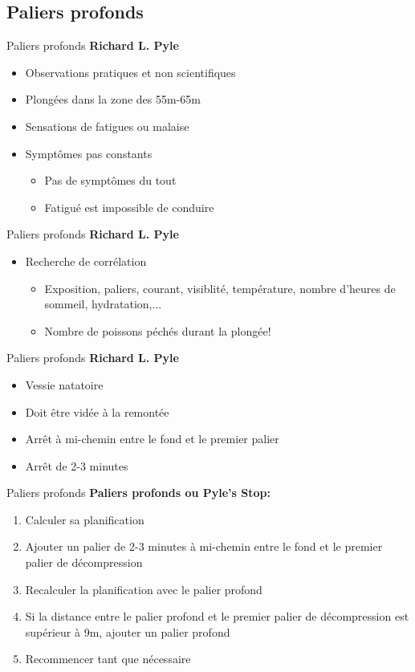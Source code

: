 \subsection{Paliers profonds}

\begin{frame}{Paliers profonds}
	\textbf{Richard L. Pyle}
	\begin{itemize}
		\item Observations pratiques et non scientifiques
		\item Plongées dans la zone des 55m-65m
		\item Sensations de fatigues ou malaise
		\item Symptômes pas constants
		\begin{itemize}
			\item Pas de symptômes du tout
			\item Fatigué est impossible de conduire
		\end{itemize}
	\end{itemize}
\end{frame}

\begin{frame}{Paliers profonds}
	\textbf{Richard L. Pyle}
	\begin{itemize}
	 	\item Recherche de corrélation
	 	\begin{itemize}
	 		\item Exposition, paliers, courant, visiblité, température, nombre d'heures de sommeil, hydratation,...
	 		\item Nombre de poissons péchés durant la plongée!
	 	\end{itemize}
	\end{itemize} 	
\end{frame}

\begin{frame}{Paliers profonds}
	\textbf{Richard L. Pyle}
	\begin{itemize}
	 	\item Vessie natatoire
	 	\item Doit être vidée à la remontée
	 	\item Arrêt à mi-chemin entre le fond et le premier palier
	 	\item Arrêt de 2-3 minutes
	\end{itemize} 	
\end{frame}

\begin{frame}{Paliers profonds}
	\textbf{Paliers profonds ou Pyle's Stop:}
	\begin{enumerate}
		\item Calculer sa planification
		\item Ajouter un palier de 2-3 minutes à mi-chemin entre le fond et le premier palier de décompression
		\item Recalculer la planification avec le palier profond
		\item Si la distance entre le palier profond et le premier palier de décompression est supérieur à 9m, ajouter un palier profond
		\item Recommencer tant que nécessaire
	\end{enumerate}	
\end{frame}


